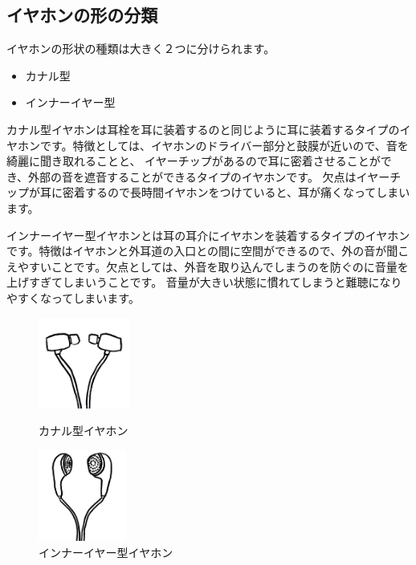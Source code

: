 \documentclass[11pt,b5paper,papersize,dvipdfmx]{jsbook}
\begin{document}
\subsection{イヤホンの形の分類}
イヤホンの形状の種類は大きく２つに分けられます。
\begin{itemize}
  \item カナル型
  \item インナーイヤー型
\end{itemize}
カナル型イヤホンは耳栓を耳に装着するのと同じように耳に装着するタイプのイヤホンです。特徴としては、イヤホンのドライバー部分と鼓膜が近いので、音を綺麗に聞き取れることと、
イヤーチップがあるので耳に密着させることができ、外部の音を遮音することができるタイプのイヤホンです。
欠点はイヤーチップが耳に密着するので長時間イヤホンをつけていると、耳が痛くなってしまいます。\par
インナーイヤー型イヤホンとは耳の耳介にイヤホンを装着するタイプのイヤホンです。特徴はイヤホンと外耳道の入口との間に空間ができるので、外の音が聞こえやすいことです。欠点としては、外音を取り込んでしまうのを防ぐのに音量を上げすぎてしまいうことです。
音量が大きい状態に慣れてしまうと難聴になりやすくなってしまいます。
\begin{figure}[H]
  \begin{minipage}{0.48\hsize}
    \begin{center}
      \includegraphics[height=3cm]{nsmr/img/kanaru.png}
    \end{center}
    \caption{カナル型イヤホン}
    \label{fig:kanaru}
  \end{minipage}
  \begin{minipage}{0.48\hsize}
    \begin{center}
      \includegraphics[height=3cm]{nsmr/img/inear.png}
    \end{center}
    \caption{インナーイヤー型イヤホン}
    \label{fig:innia}
  \end{minipage}
\end{figure}
\end{document}
